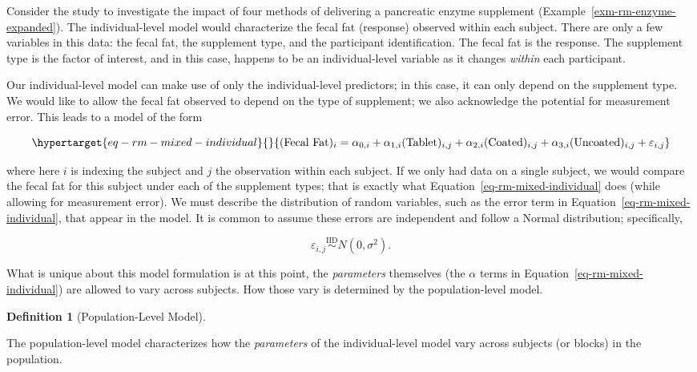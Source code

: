 \documentclass[
  letterpaper,
  DIV=11,
  numbers=noendperiod]{scrreprt}
\theoremstyle{definition}
\theoremstyle{definition}
\newtheorem{definition}{Definition}[chapter]
\theoremstyle{remark}
\begin{document}
Consider the study to investigate the impact of four methods of
delivering a pancreatic enzyme supplement
(Example~\ref{exm-rm-enzyme-expanded}). The individual-level model would
characterize the fecal fat (response) observed within each subject.
There are only a few variables in this data: the fecal fat, the
supplement type, and the participant identification. The fecal fat is
the response. The supplement type is the factor of interest, and in this
case, happens to be an individual-level variable as it changes
\emph{within} each participant.

Our individual-level model can make use of only the individual-level
predictors; in this case, it can only depend on the supplement type. We
would like to allow the fecal fat observed to depend on the type of
supplement; we also acknowledge the potential for measurement error.
This leads to a model of the form

\begin{equation}\protect\hypertarget{eq-rm-mixed-individual}{}{(\text{Fecal Fat})_i = \alpha_{0,i} + \alpha_{1,i} (\text{Tablet})_{i,j} + \alpha_{2,i} (\text{Coated})_{i,j} + \alpha_{3,i} (\text{Uncoated})_{i,j} + \varepsilon_{i,j}}\label{eq-rm-mixed-individual}\end{equation}

where here \(i\) is indexing the subject and \(j\) the observation
within each subject. If we only had data on a single subject, we would
compare the fecal fat for this subject under each of the supplement
types; that is exactly what Equation~\ref{eq-rm-mixed-individual} does
(while allowing for measurement error). We must describe the
distribution of random variables, such as the error term in
Equation~\ref{eq-rm-mixed-individual}, that appear in the model. It is
common to assume these errors are independent and follow a Normal
distribution; specifically,

\[\varepsilon_{i,j} \stackrel{\text{IID}}{\sim} N\left(0, \sigma^2\right).\]

What is unique about this model formulation is at this point, the
\emph{parameters} themselves (the \(\alpha\) terms in
Equation~\ref{eq-rm-mixed-individual}) are allowed to vary across
subjects. How those vary is determined by the population-level model.

\begin{definition}[Population-Level
Model]\protect\hypertarget{def-population-model}{}\label{def-population-model}

The population-level model characterizes how the \emph{parameters} of
the individual-level model vary across subjects (or blocks) in the
population.

\end{definition}
\end{document}
